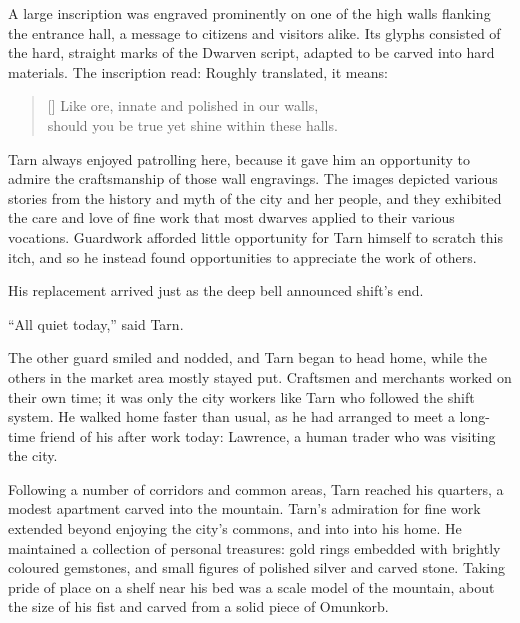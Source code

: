 A large inscription was engraved prominently on one of the high walls flanking the entrance hall, a message to citizens and visitors alike.  Its glyphs consisted of the hard, straight marks of the Dwarven script, adapted to be carved into hard materials.  The inscription read:
Roughly translated, it means:
\settowidth{\versewidth}{Like ore, innate and polished in our walls,}
\begin{verse}[\versewidth]
Like ore, innate and polished in our walls,\\
should you be true yet shine within these halls.
\end{verse}

Tarn always enjoyed patrolling here, because it gave him an opportunity to admire the craftsmanship of those wall engravings.  The images depicted various stories from the history and myth of the city and her people, and they exhibited the care and love of fine work that most dwarves applied to their various vocations.  Guardwork afforded little opportunity for Tarn himself to scratch this itch, and so he instead found opportunities to appreciate the work of others.

His replacement arrived just as the deep bell announced shift's end.

``All quiet today,'' said Tarn.

The other guard smiled and nodded, and Tarn began to head home, while the others in the market area mostly stayed put.  Craftsmen and merchants worked on their own time; it was only the city workers like Tarn who followed the shift system.  He walked home faster than usual, as he had arranged to meet a long-time friend of his after work today: Lawrence, a human trader who was visiting the city.

Following a number of corridors and common areas, Tarn reached his quarters, a modest apartment carved into the mountain.
Tarn's admiration for fine work extended beyond enjoying the city's commons, and into into his home.  He maintained a collection of personal treasures: gold rings embedded with brightly coloured gemstones, and small figures of polished silver and carved stone.  Taking pride of place on a shelf near his bed was a scale model of the mountain, about the size of his fist and carved from a solid piece of Omunkorb.

